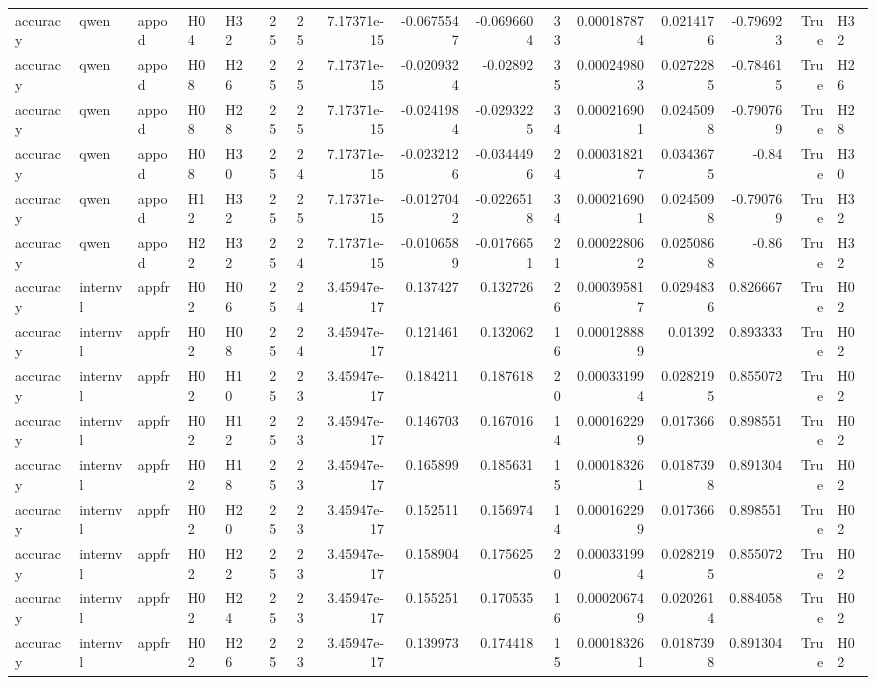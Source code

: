 \begin{longtable}{lllllrrrrrrrrrrl}
accuracy & qwen & appod & H04 & H32 & 25 & 25 & 7.17371e-15 & -0.0675547 & -0.0696604 & 33 & 0.000187874 & 0.0214176 & -0.796923 & True & H32 \\
accuracy & qwen & appod & H08 & H26 & 25 & 25 & 7.17371e-15 & -0.0209324 & -0.02892 & 35 & 0.000249803 & 0.0272285 & -0.784615 & True & H26 \\
accuracy & qwen & appod & H08 & H28 & 25 & 25 & 7.17371e-15 & -0.0241984 & -0.0293225 & 34 & 0.000216901 & 0.0245098 & -0.790769 & True & H28 \\
accuracy & qwen & appod & H08 & H30 & 25 & 24 & 7.17371e-15 & -0.0232126 & -0.0344496 & 24 & 0.000318217 & 0.0343675 & -0.84 & True & H30 \\
accuracy & qwen & appod & H12 & H32 & 25 & 25 & 7.17371e-15 & -0.0127042 & -0.0226518 & 34 & 0.000216901 & 0.0245098 & -0.790769 & True & H32 \\
accuracy & qwen & appod & H22 & H32 & 25 & 24 & 7.17371e-15 & -0.0106589 & -0.0176651 & 21 & 0.000228062 & 0.0250868 & -0.86 & True & H32 \\
accuracy & internvl & appfr & H02 & H06 & 25 & 24 & 3.45947e-17 & 0.137427 & 0.132726 & 26 & 0.000395817 & 0.0294836 & 0.826667 & True & H02 \\
accuracy & internvl & appfr & H02 & H08 & 25 & 24 & 3.45947e-17 & 0.121461 & 0.132062 & 16 & 0.000128889 & 0.01392 & 0.893333 & True & H02 \\
accuracy & internvl & appfr & H02 & H10 & 25 & 23 & 3.45947e-17 & 0.184211 & 0.187618 & 20 & 0.000331994 & 0.0282195 & 0.855072 & True & H02 \\
accuracy & internvl & appfr & H02 & H12 & 25 & 23 & 3.45947e-17 & 0.146703 & 0.167016 & 14 & 0.000162299 & 0.017366 & 0.898551 & True & H02 \\
accuracy & internvl & appfr & H02 & H18 & 25 & 23 & 3.45947e-17 & 0.165899 & 0.185631 & 15 & 0.000183261 & 0.0187398 & 0.891304 & True & H02 \\
accuracy & internvl & appfr & H02 & H20 & 25 & 23 & 3.45947e-17 & 0.152511 & 0.156974 & 14 & 0.000162299 & 0.017366 & 0.898551 & True & H02 \\
accuracy & internvl & appfr & H02 & H22 & 25 & 23 & 3.45947e-17 & 0.158904 & 0.175625 & 20 & 0.000331994 & 0.0282195 & 0.855072 & True & H02 \\
accuracy & internvl & appfr & H02 & H24 & 25 & 23 & 3.45947e-17 & 0.155251 & 0.170535 & 16 & 0.000206749 & 0.0202614 & 0.884058 & True & H02 \\
accuracy & internvl & appfr & H02 & H26 & 25 & 23 & 3.45947e-17 & 0.139973 & 0.174418 & 15 & 0.000183261 & 0.0187398 & 0.891304 & True & H02 \\

\end{longtable}
